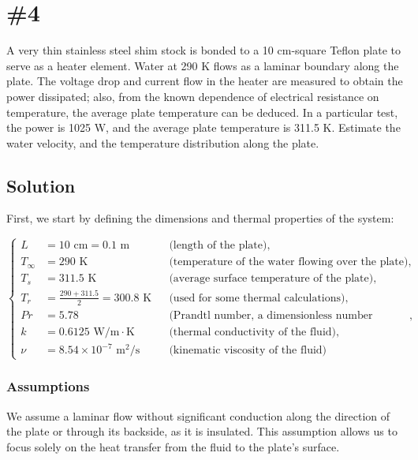 \documentclass{article}
\numberwithin{equation}{section}
\begin{document}
\newpage
\section{\#4} 
A very thin stainless steel shim stock is bonded to a 10 cm-square Teflon plate to serve as a heater element. Water at 290 K flows as a laminar boundary along the plate. The voltage drop and current flow in the heater are measured to obtain the power dissipated; also, from the known dependence of electrical resistance on temperature, the average plate temperature can be deduced. In a particular test, the power is 1025 W, and the average plate temperature is 311.5 K. Estimate the water velocity, and the temperature distribution along the plate.


\subsection*{Solution}
First, we start by defining the dimensions and thermal properties of the system:

\begin{equation}
\left\{
\begin{aligned}
    L &= 10 \text{ cm} = 0.1 \text{ m} && \text{(length of the plate)}, \\
    T_{\infty} &= 290 \text{ K} && \text{(temperature of the water flowing over the plate)}, \\
    T_{s} &= 311.5 \text{ K} && \text{(average surface temperature of the plate)}, \\
    T_{r} &= \frac{290 + 311.5}{2} = 300.8 \text{ K} && \text{(used for some thermal calculations)}, \\
    Pr &= 5.78 && \text{(Prandtl number, a dimensionless number relevant in fluid flow)}, \\
    k &= 0.6125 \text{ W/m}\cdot\text{K} && \text{(thermal conductivity of the fluid)}, \\
    \nu &= 8.54 \times 10^{-7} \text{ m}^2/\text{s} && \text{(kinematic viscosity of the fluid)}
\end{aligned}
\right.
\end{equation}


\subsubsection*{Assumptions}
\noindent
We assume a laminar flow without significant conduction along the direction of the plate or through its backside, as it is insulated. This assumption allows us to focus solely on the heat transfer from the fluid to the plate's surface.
\end{document}
